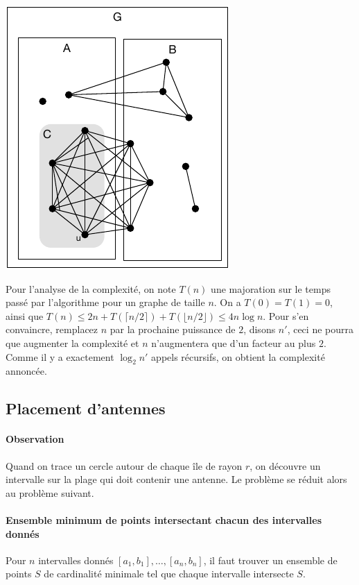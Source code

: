 \documentclass[12pt]{article}
\begin{document}
     \centerline{\includegraphics{grande_clique.pdf}}

     Pour l'analyse de la complexité, on note $T(n)$ une majoration sur le
     temps passé par l'algorithme pour un graphe de taille $n$.  On a $T(0) =
     T(1) = 0$, ainsi que $T(n) \leq 2n + T(\lceil n/2 \rceil)+ T(\lfloor n/2
     \rfloor) \leq 4n \log n$. Pour s'en convaincre, remplacez $n$ par la
     prochaine puissance de $2$, disons $n'$, ceci ne pourra que augmenter la
     complexité et $n$ n'augmentera que d'un facteur au plus $2$.  Comme il y
     a exactement $\log_2 n'$ appels récursifs, on obtient la complexité
     annoncée.

\subsection{Placement d'antennes}


\paragraph{Observation}
Quand on trace un cercle autour de chaque île de rayon $r$, on découvre un intervalle sur la plage qui doit contenir une antenne. Le problème se réduit alors au problème suivant.

\paragraph{Ensemble minimum de points intersectant chacun des intervalles donnés}
Pour $n$ intervalles donnés $[a_1,b_1],\ldots,[a_n,b_n]$, il faut trouver un ensemble de points $S$ de cardinalité minimale tel que chaque intervalle intersecte $S$.
\end{document}
